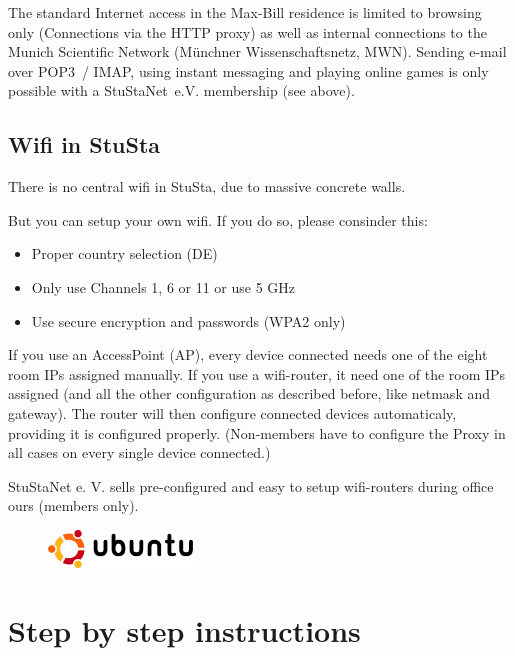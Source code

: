 \documentclass[a4paper,12pt]{scrartcl}
\begin{document}
The standard Internet access in the Max-Bill residence is limited to browsing only (Connections via the HTTP proxy) as well as internal connections to the Munich Scientific Network (Münchner Wissenschaftsnetz, MWN). Sending e-mail over POP3~/ IMAP, using instant messaging and playing online games is only possible with a StuStaNet~e.V. membership (see above).

\subsection*{Wifi in StuSta}
There is no central wifi in StuSta, due to massive concrete walls.

But you can setup your own wifi. If you do so, please consinder this:
\begin{itemize}
    \item Proper country selection (DE)
    \item Only use Channels 1, 6 or 11 or use 5 GHz
    \item Use secure encryption and passwords (WPA2 only)
\end{itemize}

If you use an AccessPoint (AP), every device connected needs one of the eight room IPs assigned manually. If you use a wifi-router, it need one of the room IPs assigned (and all the other configuration as described before, like netmask and gateway). The router will then configure connected devices automaticaly, providing it is configured properly. (Non-members have to configure the Proxy in all cases on every single device connected.)

\vspace{2em}

StuStaNet e. V. sells pre-configured and easy to setup wifi-routers during office ours (members only).

\newpage

\begin{figure}[t!]
    \raggedleft
    \vspace{-20pt}
    \includegraphics[height=1cm,keepaspectratio]{Bilder/Ubuntu_logo}
    \vspace{-30pt}
\end{figure}

\section*{Step by step instructions}
\end{document}
